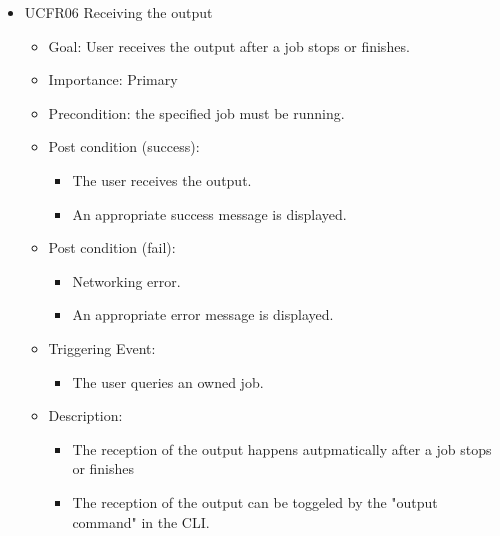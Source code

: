 \begin{itemize}
	\item UCFR06 Receiving the output
	\begin{itemize}
		\item Goal: User receives the output after a job stops or finishes.
		\item Importance: Primary
		\item Precondition: the specified job must be running.
		\item Post condition (success): 
		\begin{itemize}
			\item The user receives the output.
			\item An appropriate success message is displayed.
		\end{itemize}  
		\item Post condition (fail):
		\begin{itemize}
			\item Networking error.
			\item An appropriate error message is displayed.
		\end{itemize}
		\item Triggering Event:
		\begin{itemize}
		 \item The user queries an owned job.
	    \end{itemize}
		\item Description:
		\begin{itemize}
			\item The reception of the output happens autpmatically after a job stops or finishes
			\item The reception of the output can be toggeled by the "output command" in the CLI.
		\end{itemize}
	\end{itemize}
\end{itemize}

